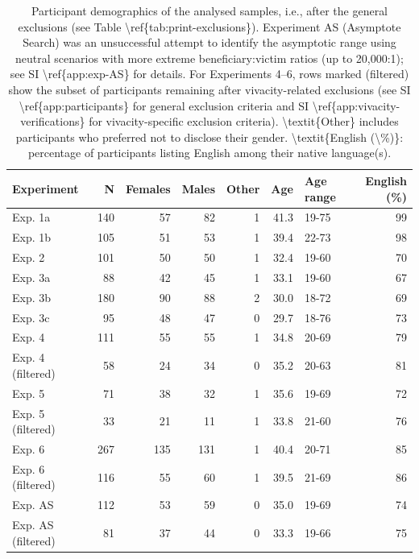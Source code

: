 \documentclass[
]{article}
\begin{document}
\begin{table}
\centering
\caption{\label{tab:print-demographics}Participant demographics of the analysed samples, i.e., after the general exclusions (see Table \textbackslash{}ref\{tab:print-exclusions\}). Experiment AS (Asymptote Search) was an unsuccessful attempt to identify the asymptotic range using neutral scenarios with more extreme beneficiary:victim ratios (up to 20,000:1); see SI \textbackslash{}ref\{app:exp-AS\} for details. For Experiments 4--6, rows marked (filtered) show the subset of participants remaining after vivacity-related exclusions (see SI \textbackslash{}ref\{app:participants\} for general exclusion criteria and SI \textbackslash{}ref\{app:vivacity-verifications\} for vivacity-specific exclusion criteria). \textbackslash{}textit\{Other\} includes participants who preferred not to disclose their gender. \textbackslash{}textit\{English (\textbackslash{}\%)\}: percentage of participants listing English among their native language(s).}
\centering
\begin{tabular}[t]{lrrrrrlr}
\toprule
Experiment & N & Females & Males & Other & Age & Age range & English (\%)\\
\midrule
Exp. 1a & 140 & 57 & 82 & 1 & 41.3 & 19-75 & 99\\
Exp. 1b & 105 & 51 & 53 & 1 & 39.4 & 22-73 & 98\\
Exp. 2 & 101 & 50 & 50 & 1 & 32.4 & 19-60 & 70\\
Exp. 3a & 88 & 42 & 45 & 1 & 33.1 & 19-60 & 67\\
Exp. 3b & 180 & 90 & 88 & 2 & 30.0 & 18-72 & 69\\
\addlinespace
Exp. 3c & 95 & 48 & 47 & 0 & 29.7 & 18-76 & 73\\
Exp. 4 & 111 & 55 & 55 & 1 & 34.8 & 20-69 & 79\\
Exp. 4 (filtered) & 58 & 24 & 34 & 0 & 35.2 & 20-63 & 81\\
Exp. 5 & 71 & 38 & 32 & 1 & 35.6 & 19-69 & 72\\
Exp. 5 (filtered) & 33 & 21 & 11 & 1 & 33.8 & 21-60 & 76\\
\addlinespace
Exp. 6 & 267 & 135 & 131 & 1 & 40.4 & 20-71 & 85\\
Exp. 6 (filtered) & 116 & 55 & 60 & 1 & 39.5 & 21-69 & 86\\
Exp. AS & 112 & 53 & 59 & 0 & 35.0 & 19-69 & 74\\
Exp. AS (filtered) & 81 & 37 & 44 & 0 & 33.3 & 19-66 & 75\\
\bottomrule
\end{tabular}
\end{table}
\end{document}
